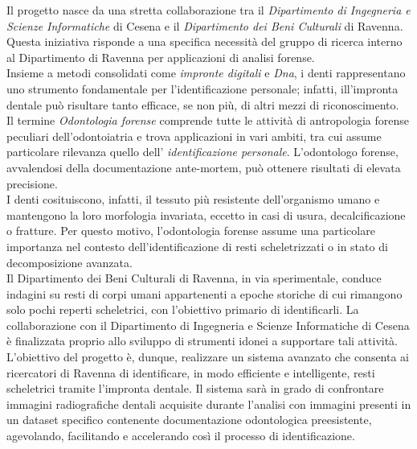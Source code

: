 \documentclass[12pt,a4paper,openright,twoside]{book}
\begin{document}
Il progetto nasce da una stretta collaborazione tra il {\itshape Dipartimento di Ingegneria e Scienze Informatiche} di Cesena e il {\itshape Dipartimento dei Beni Culturali} di Ravenna. Questa iniziativa risponde a una specifica necessità del gruppo di ricerca interno al Dipartimento di Ravenna per applicazioni di analisi forense.\\

Insieme a metodi consolidati come {\itshape impronte digitali} e {\itshape Dna}, i denti rappresentano uno strumento fondamentale per l'identificazione personale; infatti, ill’impronta dentale può risultare tanto efficace, se non più, di altri mezzi di riconoscimento.\\

Il termine {\itshape Odontologia forense} comprende tutte le attività di antropologia forense peculiari dell’odontoiatria e trova applicazioni in vari ambiti, tra cui assume particolare rilevanza quello dell' {\itshape identificazione personale}. L’odontologo forense, avvalendosi della documentazione ante-mortem, può ottenere risultati di elevata precisione.\\

I denti cosituiscono, infatti, il tessuto più resistente dell’organismo umano e mantengono la loro morfologia invariata, eccetto in casi di usura, decalcificazione o fratture. Per questo motivo, l’odontologia forense assume una particolare importanza nel contesto dell’identificazione di resti scheletrizzati o in stato di decomposizione avanzata.\\

Il Dipartimento dei Beni Culturali di Ravenna, in via sperimentale, conduce indagini su resti di corpi umani appartenenti a epoche storiche di cui rimangono solo pochi reperti scheletrici, con l’obiettivo primario di identificarli. La collaborazione con il Dipartimento di Ingegneria e Scienze Informatiche di Cesena è finalizzata proprio allo sviluppo di strumenti idonei a supportare tali attività.\\

L'obiettivo del progetto è, dunque, realizzare un sistema avanzato che consenta ai ricercatori di Ravenna di identificare, in modo efficiente e intelligente, resti scheletrici tramite l'impronta dentale. Il sistema sarà in grado di confrontare immagini radiografiche dentali acquisite durante l’analisi con immagini presenti in un dataset specifico contenente documentazione odontologica preesistente, agevolando, facilitando e accelerando così il processo di identificazione.
\end{document}
